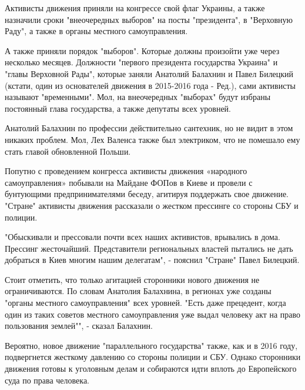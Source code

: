 Активисты движения приняли на конгрессе свой флаг Украины, а также
назначили сроки "внеочередных выборов" на посты "президента", в "Верховную
Раду", а также в органы местного самоуправления.

А также приняли порядок "выборов". Которые должны произойти уже через
несколько месяцев. Должности "первого президента государства Украина" и
"главы Верховной Рады", которые заняли Анатолий Балахнин и Павел Билецкий
(кстати, один из основателей движения в 2015-2016 года - Ред.), сами
активисты называют "временными". Мол, на внеочередных "выборах" будут
избраны постоянный глава государства, а также депутаты всех уровней.

Анатолий Балахнин по профессии действительно сантехник, но не видит в этом
никаких проблем. Мол, Лех Валенса также был электриком, что не помешало
ему стать главой обновленной Польши. 

Попутно с проведением конгресса активисты движения «народного
самоуправления» побывали на Майдане ФОПов в Киеве и провели с бунтующими
предпринимателями беседу, агитируя поддержать свое движение. "Стране"
активисты движения рассказали о жестком прессинге со стороны СБУ и
полиции.

"Обыскивали и прессовали почти всех наших активистов, врывались в дома.
Прессинг жесточайший. Представители региональных властей пытались не дать
добраться в Киев многим нашим делегатам", - пояснил "Стране" Павел
Билецкий.

Стоит отметить, что только агитацией сторонники нового движения не
ограничиваются. По словам Анатолия Балахнина, в регионах уже созданы
"органы местного самоуправления" всех уровней. "Есть даже прецедент, когда
один из таких советов местного самоуправления уже выдал человеку акт на
право пользования землей"", - сказал Балахнин.

Вероятно, новое движение "параллельного государства" также, как и в 2016
году, подвергнется жесткому давлению со стороны полиции и СБУ. Однако
сторонники движения готовы к уголовным делам и собираются идти вплоть до
Европейского суда по права человека.
